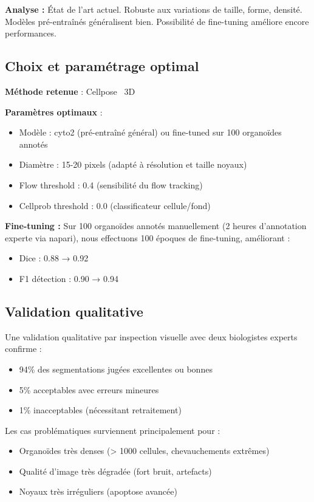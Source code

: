 \textbf{Analyse :}
État de l'art actuel. Robuste aux variations de taille, forme, densité. Modèles pré-entraînés généralisent bien. Possibilité de fine-tuning améliore encore performances.

\subsection{Choix et paramétrage optimal}

\textbf{Méthode retenue} : Cellpose~\cite{Stringer2021} 3D

\textbf{Paramètres optimaux} :
\begin{itemize}
    \item Modèle : cyto2 (pré-entraîné général) ou fine-tuned sur 100 organoïdes annotés
    \item Diamètre : 15-20 pixels (adapté à résolution et taille noyaux)
    \item Flow threshold : 0.4 (sensibilité du flow tracking)
    \item Cellprob threshold : 0.0 (classificateur cellule/fond)
\end{itemize}

\textbf{Fine-tuning :}
Sur 100 organoïdes annotés manuellement (2 heures d'annotation experte via napari), nous effectuons 100 époques de fine-tuning, améliorant :
\begin{itemize}
    \item Dice : 0.88 → 0.92
    \item F1 détection : 0.90 → 0.94
\end{itemize}

\subsection{Validation qualitative}

Une validation qualitative par inspection visuelle avec deux biologistes experts confirme :
\begin{itemize}
    \item 94\% des segmentations jugées excellentes ou bonnes
    \item 5\% acceptables avec erreurs mineures
    \item 1\% inacceptables (nécessitant retraitement)
\end{itemize}

Les cas problématiques surviennent principalement pour :
\begin{itemize}
    \item Organoïdes très denses (> 1000 cellules, chevauchements extrêmes)
    \item Qualité d'image très dégradée (fort bruit, artefacts)
    \item Noyaux très irréguliers (apoptose avancée)
\end{itemize}


